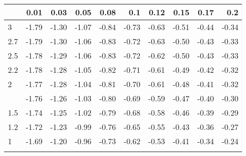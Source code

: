 
\begin{tabular}{lrrrrrrrrr}
\toprule{}
  & 0.01 & 0.03 & 0.05 & 0.08 & 0.1 & 0.12 & 0.15 & 0.17 & 0.2\\
\midrule{}
3 & -1.79 & -1.30 & -1.07 & -0.84 & -0.73 & -0.63 & -0.51 & -0.44 & -0.34\\
2.7 & -1.79 & -1.30 & -1.06 & -0.83 & -0.72 & -0.63 & -0.50 & -0.43 & -0.33\\
2.5 & -1.78 & -1.29 & -1.06 & -0.83 & -0.72 & -0.62 & -0.50 & -0.43 & -0.33\\
2.2 & -1.78 & -1.28 & -1.05 & -0.82 & -0.71 & -0.61 & -0.49 & -0.42 & -0.32\\
2 & -1.77 & -1.28 & -1.04 & -0.81 & -0.70 & -0.61 & -0.48 & -0.41 & -0.32\\
\addlinespace
1.7 & -1.76 & -1.26 & -1.03 & -0.80 & -0.69 & -0.59 & -0.47 & -0.40 & -0.30\\
1.5 & -1.74 & -1.25 & -1.02 & -0.79 & -0.68 & -0.58 & -0.46 & -0.39 & -0.29\\
1.2 & -1.72 & -1.23 & -0.99 & -0.76 & -0.65 & -0.55 & -0.43 & -0.36 & -0.27\\
1 & -1.69 & -1.20 & -0.96 & -0.73 & -0.62 & -0.53 & -0.41 & -0.34 & -0.24\\
\bottomrule{}
\end{tabular}
